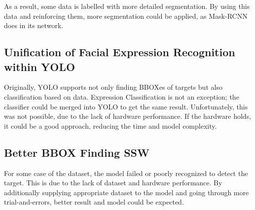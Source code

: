 \documentclass{article}
\begin{document}
As a result, some data is labelled with more detailed segmentation. By using
this data and reinforcing them, more segmentation could be applied, as Mask-RCNN
does in its network.

\subsection{Unification of Facial Expression Recognition within YOLO}
Originally, YOLO supports not only finding BBOXes of targets but also
classification based on data. Expression Classification is not an exception; the
classifier could be merged into YOLO to get the same result. Unfortunately, this
was not possible, due to the lack of hardware performance. If the hardware
holds, it could be a good approach, reducing the time and model complexity.

\subsection{Better BBOX Finding SSW}
For some case of the dataset, the model failed or poorly recognized to detect
the target. This is due to the lack of dataset and hardware performance. By
additionally supplying appropriate dataset to the model and going through more
trial-and-errors, better result and model could be expected.



\end{document}
